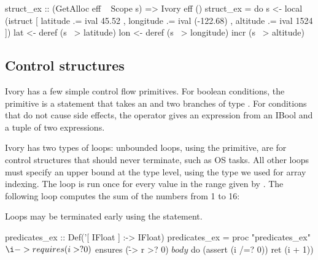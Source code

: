 \begin{code}

struct_ex :: (GetAlloc eff ~ Scope s) => Ivory eff ()
struct_ex = do
  s <- local (istruct [ latitude .= ival 45.52
                      , longitude .= ival (-122.68)
                      , altitude .= ival 1524 ])
  lat <- deref (s ~> latitude)
  lon <- deref (s ~> longitude)
  incr (s ~> altitude)
\end{code}


\subsection{Control structures}

Ivory has a few simple control flow primitives. For boolean conditions,
the  primitive is a statement that takes an  and two
branches of type . For conditions that do not cause side
effects, the  operator gives an expression from an IBool and a tuple
of two expressions.


Ivory has two types of loops: unbounded loops, using the  primitive,
are for control structures that should never terminate, such as OS tasks. All
other loops must specify an upper bound at the type level, using the  type
we used for array indexing. The  loop is run once for every value
in the range given by . The following loop computes the sum of the
numbers from 1 to 16:


Loops may be terminated early using the  statement.

\begin{code}
predicates_ex :: Def('[ IFloat ] :-> IFloat)
predicates_ex = proc "predicates_ex" $
    \i -> requires (i >? 0)
        $ ensures (\r -> r >? 0)
        $ body
        $ do (assert (i /=? 0))
             ret (i + 1))
\end{code}

